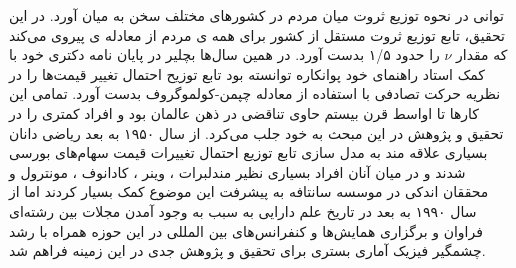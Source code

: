 \documentclass[a4paper,titlepage,12pt,fleqn,oneside]{report}
\begin{document}
توانی در نحوه توزیع ثروت میان مردم در کشورهای مختلف سخن به میان آورد. در این تحقیق، تابع توزیع ثروت مستقل از کشور برای همه ی مردم از معادله ی   پیروی می‌کند که مقدار $\nu$ را حدود ۱/۵ بدست آورد. در همین سال‌ها بچلیر در پایان نامه دکتری خود\cite{bac} با کمک استاد راهنمای خود پوانکاره توانسته بود تابع توزیح احتمال تغییر قیمت‌ها را  در نظریه حرکت تصادفی با استفاده از معادله چپمن-کولموگروف بدست آورد. تمامی این کارها تا اواسط قرن بیستم حاوی تناقضی در ذهن عالمان بود و افراد کمتری را در تحقیق و پژوهش در این مبحث به خود جلب می‌کرد. از سال ۱۹۵۰ به بعد ریاضی دانان بسیاری علاقه مند به مدل سازی تابع توزیع احتمال تغییرات قیمت سهام‌های بورسی شدند و در میان آنان افراد بسیاری نظیر مندلبرات \cite{mandel}، وینر ، کادانوف \cite{kada}، مونترول  \cite{mont} و محققان اندکی
در موسسه سانتافه\cite{santa}  به پیشرفت این موضوع کمک بسیار کردند اما از سال ۱۹۹۰ به بعد در تاریخ علم دارایی به سبب به وجود آمدن مجلات بین رشته‌ای فراوان و برگزاری همایش‌ها و کنفرانس‌های بین المللی در این حوزه همراه با رشد چشمگیر فیزیک آماری بستری برای تحقیق و پژوهش جدی در این زمینه فراهم شد.  
\end{document}
